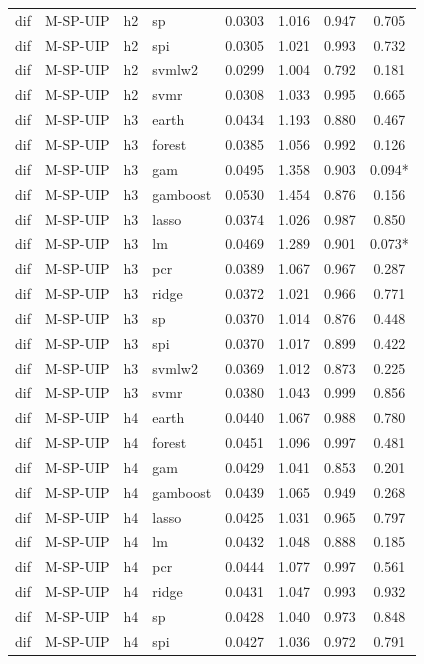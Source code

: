 \begin{ThreePartTable}
\begin{longtable}[t]{llclcccc}
dif & M-SP-UIP & h2 & sp & 0.0303 & 1.016 & 0.947 & 0.705\\
dif & M-SP-UIP & h2 & spi & 0.0305 & 1.021 & 0.993 & 0.732\\
dif & M-SP-UIP & h2 & svmlw2 & 0.0299 & 1.004 & 0.792 & 0.181\\
dif & M-SP-UIP & h2 & svmr & 0.0308 & 1.033 & 0.995 & 0.665\\
\addlinespace
dif & M-SP-UIP & h3 & earth & 0.0434 & 1.193 & 0.880 & 0.467\\
dif & M-SP-UIP & h3 & forest & 0.0385 & 1.056 & 0.992 & 0.126\\
dif & M-SP-UIP & h3 & gam & 0.0495 & 1.358 & 0.903 & 0.094*\\
dif & M-SP-UIP & h3 & gamboost & 0.0530 & 1.454 & 0.876 & 0.156\\
dif & M-SP-UIP & h3 & lasso & 0.0374 & 1.026 & 0.987 & 0.850\\
dif & M-SP-UIP & h3 & lm & 0.0469 & 1.289 & 0.901 & 0.073*\\
dif & M-SP-UIP & h3 & pcr & 0.0389 & 1.067 & 0.967 & 0.287\\
dif & M-SP-UIP & h3 & ridge & 0.0372 & 1.021 & 0.966 & 0.771\\
dif & M-SP-UIP & h3 & sp & 0.0370 & 1.014 & 0.876 & 0.448\\
dif & M-SP-UIP & h3 & spi & 0.0370 & 1.017 & 0.899 & 0.422\\
dif & M-SP-UIP & h3 & svmlw2 & 0.0369 & 1.012 & 0.873 & 0.225\\
dif & M-SP-UIP & h3 & svmr & 0.0380 & 1.043 & 0.999 & 0.856\\
\addlinespace
dif & M-SP-UIP & h4 & earth & 0.0440 & 1.067 & 0.988 & 0.780\\
dif & M-SP-UIP & h4 & forest & 0.0451 & 1.096 & 0.997 & 0.481\\
dif & M-SP-UIP & h4 & gam & 0.0429 & 1.041 & 0.853 & 0.201\\
dif & M-SP-UIP & h4 & gamboost & 0.0439 & 1.065 & 0.949 & 0.268\\
dif & M-SP-UIP & h4 & lasso & 0.0425 & 1.031 & 0.965 & 0.797\\
dif & M-SP-UIP & h4 & lm & 0.0432 & 1.048 & 0.888 & 0.185\\
dif & M-SP-UIP & h4 & pcr & 0.0444 & 1.077 & 0.997 & 0.561\\
dif & M-SP-UIP & h4 & ridge & 0.0431 & 1.047 & 0.993 & 0.932\\
dif & M-SP-UIP & h4 & sp & 0.0428 & 1.040 & 0.973 & 0.848\\
dif & M-SP-UIP & h4 & spi & 0.0427 & 1.036 & 0.972 & 0.791\\

\end{longtable}
\end{ThreePartTable}
